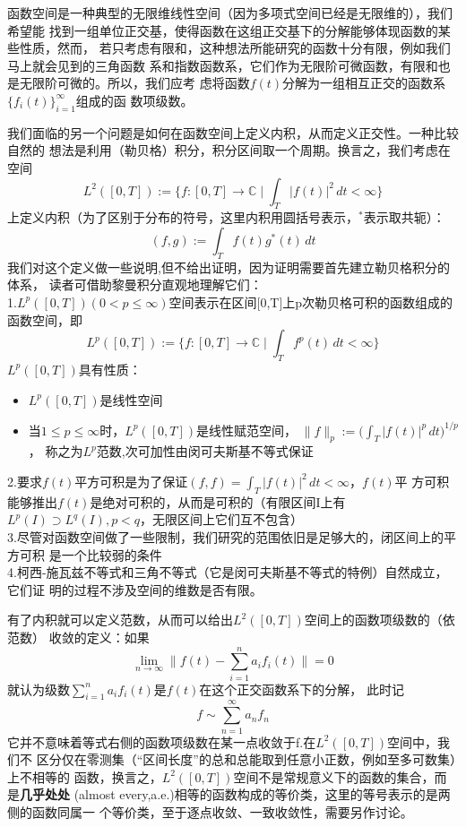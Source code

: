 \documentclass{ctexbook}
\begin{document}
函数空间是一种典型的无限维线性空间（因为多项式空间已经是无限维的），我们希望能
找到一组单位正交基，使得函数在这组正交基下的分解能够体现函数的某些性质，然而，
若只考虑有限和，这种想法所能研究的函数十分有限，例如我们马上就会见到的三角函数
系和指数函数系，它们作为无限阶可微函数，有限和也是无限阶可微的。所以，我们应考
虑将函数$f(t)$分解为一组相互正交的函数系$\{f_i(t)\}_{i=1}^{\infty}$组成的函
数项级数。

我们面临的另一个问题是如何在函数空间上定义内积，从而定义正交性。一种比较自然的
想法是利用（勒贝格）积分，积分区间取一个周期。换言之，我们考虑在空间
\[L^2([0,T]):=\{f:[0,T]\rightarrow \mathbb{C} \mid \int_{T}|f(t)|^2\,dt<\infty\}\]
上定义内积（为了区别于分布的符号，这里内积用圆括号表示，$^*$表示取共轭）：
\[(f,g):=\int_{T}f(t)g^*(t)\,dt \]
我们对这个定义做一些说明,但不给出证明，因为证明需要首先建立勒贝格积分的体系，
读者可借助黎曼积分直观地理解它们：\\
1.$L^p([0,T])(0<p\leq \infty)$空间表示在区间[0,T]上p次勒贝格可积的函数组成的函数空间，即
\[L^p([0,T]):=\{f:[0,T]\rightarrow \mathbb{C} \mid \int_{T}f^p(t)\,dt<\infty\}\]
$L^p([0,T])$具有性质：
\begin{itemize}
    \item \raggedright{} $L^p([0,T])$是线性空间\\
    \item 当$1\leq p \leq \infty$时，$L^p([0,T])$是线性赋范空间，
          $\| f \|_{p} := \bigl( \int_{T} |f(t)|^p \, dt \bigr)^{1/p}$，
          称之为$L^p$范数,次可加性由闵可夫斯基不等式保证
\end{itemize}
2.要求$f(t)$平方可积是为了保证$(f,f)=\int_{T}|f(t)|^2\,dt<\infty$，$f(t)$平
方可积能够推出$f(t)$是绝对可积的，从而是可积的（有限区间I上有$L^p(I)\supset  L^q(I),p<q$，无限区间上它们互不包含）\\
3.尽管对函数空间做了一些限制，我们研究的范围依旧是足够大的，闭区间上的平方可积
是一个比较弱的条件\\
4.柯西-施瓦兹不等式和三角不等式（它是闵可夫斯基不等式的特例）自然成立，它们证
明的过程不涉及空间的维数是否有限。

有了内积就可以定义范数，从而可以给出$L^2([0,T])$空间上的函数项级数的（依范数）
收敛的定义：如果
\[\lim_{n \to \infty} \| f(t)-\sum_{i = 1}^{n}  a_i f_i(t)\|=0\]
就认为级数$\sum_{i = 1}^{n}  a_i f_i(t)$是$f(t)$在这个正交函数系下的分解，
此时记\[f\sim\sum_{n=1}^{\infty}a_n f_n\]
它并不意味着等式右侧的函数项级数在某一点收敛于f.在$L^2([0,T])$空间中，我们不
区分仅在零测集（“区间长度”的总和总能取到任意小正数，例如至多可数集）上不相等的
函数，换言之，$L^2([0,T])$空间不是常规意义下的函数的集合，而是\textbf{几乎处处}
(almost every,a.e.)相等的函数构成的等价类，这里的等号表示的是两侧的函数同属一
个等价类，至于逐点收敛、一致收敛性，需要另作讨论。
\end{document}
